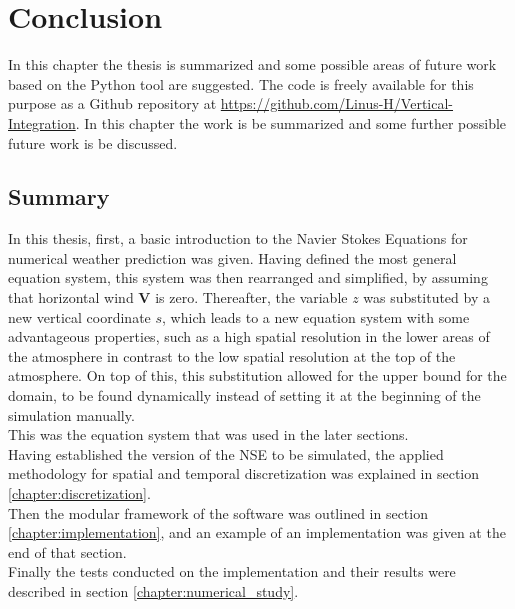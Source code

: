 
\chapter{Conclusion}\label{chapter:conclusion}
In this chapter the thesis is summarized and some possible areas of future work based on the Python tool are suggested.
The code is freely available for this purpose as a Github repository at \url{https://github.com/Linus-H/Vertical-Integration}.
In this chapter the work is be summarized and some further possible future work is be discussed.

\section{Summary}
In this thesis, first, a basic introduction to the Navier Stokes Equations for numerical weather prediction was given.
Having defined the most general equation system, this system was then rearranged and simplified, by assuming that horizontal wind $\textbf{V}$ is zero.
Thereafter, the variable $z$ was substituted by a new vertical coordinate $s$, which leads to a new equation system with some advantageous properties, such as a high spatial resolution in the lower areas of the atmosphere in contrast to the low spatial resolution at the top of the atmosphere.
On top of this, this substitution allowed for the upper bound for the domain, to be found dynamically instead of setting it at the beginning of the simulation manually.\\
This was the equation system that was used in the later sections.\\
Having established the version of the NSE to be simulated, the applied methodology for spatial and temporal discretization was explained in section \ref{chapter:discretization}.\\
Then the modular framework of the software was outlined in section \ref{chapter:implementation}, and an example of an implementation was given at the end of that section.\\
Finally the tests conducted on the implementation and their results were described in section \ref{chapter:numerical_study}.


